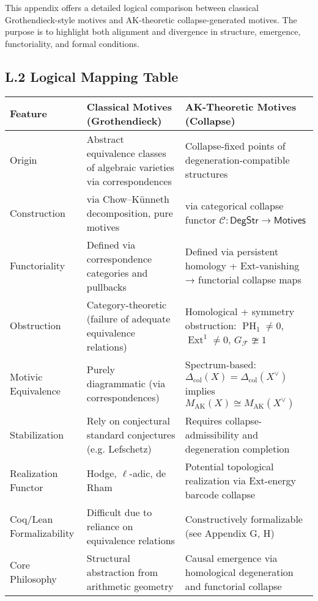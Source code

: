 \documentclass[11pt]{article}
\DeclareMathOperator{\Ext}{Ext}
\DeclareMathOperator{\PH}{PH}
\begin{document}
This appendix offers a detailed logical comparison between classical Grothendieck-style motives and AK-theoretic collapse-generated motives. The purpose is to highlight both alignment and divergence in structure, emergence, functoriality, and formal conditions.

\subsection*{L.2 Logical Mapping Table}

\begin{center}
\renewcommand{\arraystretch}{1.4}
\begin{tabular}{|p{4.8cm}|p{5.8cm}|p{5.8cm}|}
\hline
\textbf{Feature} & \textbf{Classical Motives (Grothendieck)} & \textbf{AK-Theoretic Motives (Collapse)} \\
\hline
Origin & Abstract equivalence classes of algebraic varieties via correspondences & Collapse-fixed points of degeneration-compatible structures \\
\hline
Construction & via Chow–Künneth decomposition, pure motives & via categorical collapse functor $\mathcal{C}: \mathsf{DegStr} \to \mathsf{Motives}$ \\
\hline
Functoriality & Defined via correspondence categories and pullbacks & Defined via persistent homology + Ext-vanishing → functorial collapse maps \\
\hline
Obstruction & Category-theoretic (failure of adequate equivalence relations) & Homological + symmetry obstruction: $\PH_1 \neq 0$, $\Ext^1 \neq 0$, $G_{\mathcal{F}} \ncong 1$ \\
\hline
Motivic Equivalence & Purely diagrammatic (via correspondences) & Spectrum-based: $\Delta_{\mathrm{col}}(X) = \Delta_{\mathrm{col}}(X^\vee)$ implies $M_{\mathrm{AK}}(X) \cong M_{\mathrm{AK}}(X^\vee)$ \\
\hline
Stabilization & Rely on conjectural standard conjectures (e.g. Lefschetz) & Requires collapse-admissibility and degeneration completion \\
\hline
Realization Functor & Hodge, $\ell$-adic, de Rham & Potential topological realization via Ext-energy barcode collapse \\
\hline
Coq/Lean Formalizability & Difficult due to reliance on equivalence relations & Constructively formalizable (see Appendix G, H) \\
\hline
Core Philosophy & Structural abstraction from arithmetic geometry & Causal emergence via homological degeneration and functorial collapse \\
\hline
\end{tabular}
\end{center}
\end{document}
